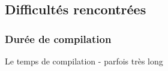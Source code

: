 \documentclass[10pt,a4paper]{article}
\begin{document}
\subsection{Difficultés rencontrées}
\subsubsection{Durée de compilation}
Le temps de compilation - parfois très long 
\newpage


%
\end{document}
